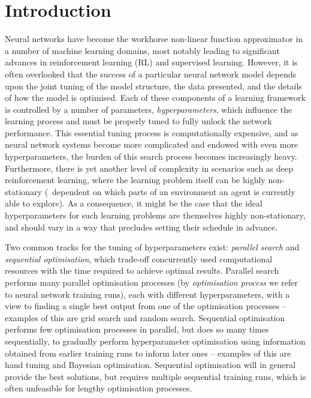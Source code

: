 \section{Introduction}


Neural networks have become the workhorse non-linear function approximator in a number of machine learning domains, most notably leading to significant advances in reinforcement learning (RL) and supervised learning. 
%
However, it is often overlooked that the success of a particular neural network model depends upon the joint tuning of the model structure, the data presented, and the details of how the model is optimised. Each of these components of a learning framework is controlled by a number of parameters, \emph{hyperparameters}, which influence the learning process and must be properly tuned to fully unlock the network performance.
%
This essential tuning process is computationally expensive, and as neural network systems become more complicated and endowed with even more hyperparameters, the burden of this search process becomes increasingly heavy. 
Furthermore, there is yet another level of complexity in scenarios such as deep reinforcement learning, where the learning problem itself can be highly non-stationary (\eg~dependent on which parts of an environment an agent is currently able to explore). As a consequence, it might be the case that the ideal hyperparameters for such learning problems are themselves highly non-stationary, and should vary in a way that precludes setting their schedule in advance.

Two common tracks for the tuning of hyperparameters exist: \emph{parallel search} and \emph{sequential optimisation}, which trade-off concurrently used computational resources with the time required to achieve optimal results. 
%
Parallel search performs many parallel optimisation processes (by \emph{optimisation process} we refer to neural network training runs), each with different hyperparameters, with a view to finding a single best output from one of the optimisation processes -- examples of this are grid search and random search. 
%
Sequential optimisation performs few optimisation processes in parallel, but does so many times sequentially, to gradually perform hyperparameter optimisation using information obtained from earlier training runs to inform later ones -- examples of this are hand tuning and Bayesian optimisation. Sequential optimisation will in general provide the best solutions, but requires multiple sequential training runs, which is often unfeasible for lengthy optimisation processes.


